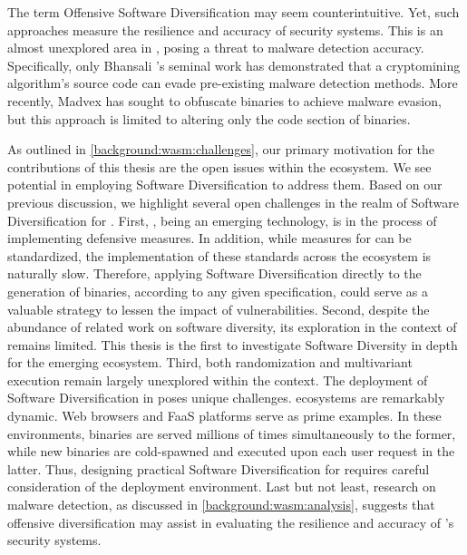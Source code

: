The term Offensive Software Diversification may seem counterintuitive.
Yet, such approaches measure the resilience and accuracy of security systems. 
This is an almost unexplored area in \Wasm, posing a threat to malware detection accuracy. 
Specifically, only Bhansali \etal's seminal work \cite{10.1145/3507657.3528560} has demonstrated that a cryptomining algorithm's source code can evade pre-existing malware detection methods. 
More recently, Madvex \cite{madvex} has sought to obfuscate \Wasm binaries to achieve malware evasion, but this approach is limited to altering only the code section of \Wasm binaries.



\label{sota:openchallenges}
As outlined in \autoref{background:wasm:challenges}, our primary motivation for the contributions of this thesis are the open issues within the \Wasm ecosystem. 
We see potential in employing Software Diversification to address them. 
Based on our previous discussion, we highlight several open challenges in the realm of Software Diversification for \Wasm. 
First, \Wasm, being an emerging technology, is in the process of implementing defensive measures. 
In addition, while measures for \Wasm can be standardized, the implementation of these standards across the ecosystem is naturally slow. 
Therefore, applying Software Diversification directly to the generation of \Wasm binaries, according to any given specification, could serve as a valuable strategy to lessen the impact of vulnerabilities.
Second, despite the abundance of related work on software diversity, its exploration in the context of \Wasm remains limited. 
This thesis is the first to investigate Software Diversity in depth for the emerging \Wasm ecosystem.
Third, both randomization and multivariant execution remain largely unexplored within the \Wasm context. 
The deployment of Software Diversification in \Wasm poses unique challenges. 
\Wasm ecosystems are remarkably dynamic. 
Web browsers and FaaS platforms serve as prime examples. 
In these environments, \Wasm binaries are served millions of times simultaneously to the former, while new \Wasm binaries are cold-spawned and executed upon each user request in the latter. 
Thus, designing practical Software Diversification for \Wasm requires careful consideration of the deployment environment. 
Last but not least, research on malware detection, as discussed in \autoref{background:wasm:analysis}, suggests that offensive diversification may assist in evaluating the resilience and accuracy of \Wasm's security systems.

